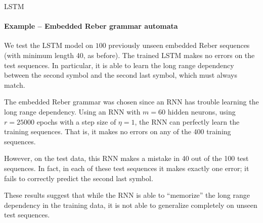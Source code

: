 \begin{frame}{LSTM}
\framesubtitle{Example -- Embedded Reber grammar automata}
%
    We test the LSTM model on $100$ previously unseen embedded Reber
    sequences (with minimum length 40, as before). The trained LSTM makes no
    errors on the test sequences. In particular, it is able to learn the
    long range dependency between the second symbol and the second last
    symbol, which must always match.

\medskip
    
    The embedded Reber grammar was chosen since an RNN has trouble
    learning the long range dependency. 
    Using an RNN with $m=60$ hidden neurons, using $r=25000$ epochs
    with a step size of $\eta=1$, the RNN can perfectly learn the training
    sequences. That is, it makes no errors on any of the 400 training
    sequences. 

\medskip

However, on the test data, this RNN makes a mistake in
    40
    out of the 100 test sequences. In fact, in each of these test
    sequences it makes exactly one error; it fails
    to correctly predict the second last symbol. 

\medskip

These results suggest that
    while the RNN is able to ``memorize'' the long range dependency in
    the training data, it is not able to generalize completely on unseen
    test sequences.
\end{frame}
%
%
\ifdefined\wox \begin{frame} \titlepage \end{frame} \fi

